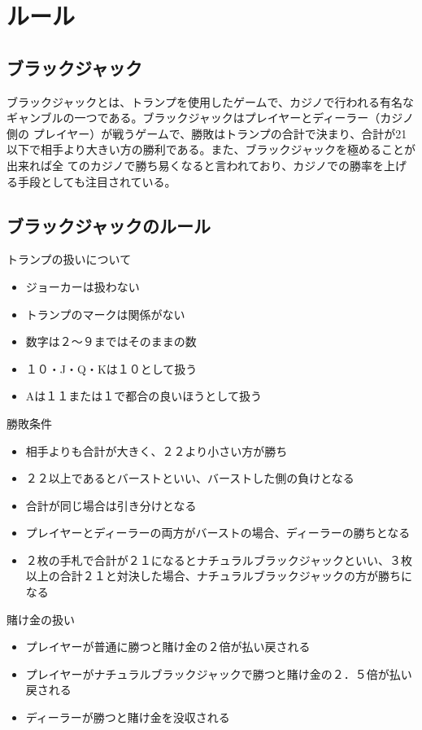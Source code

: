 \section{ルール}
\subsection{ブラックジャック}
ブラックジャックとは、トランプを使用したゲームで、カジノで行われる有名なギャンブルの一つである。ブラックジャックはプレイヤーとディーラー（カジノ側の
プレイヤー）が戦うゲームで、勝敗はトランプの合計で決まり、合計が21以下で相手より大きい方の勝利である。また、ブラックジャックを極めることが出来れば全
てのカジノで勝ち易くなると言われており、カジノでの勝率を上げる手段としても注目されている。

\subsection{ブラックジャックのルール}
トランプの扱いについて
\begin{itemize}
\item ジョーカーは扱わない
\item トランプのマークは関係がない
\item 数字は２～９まではそのままの数
\item １０・J・Q・Kは１０として扱う
\item Aは１１または１で都合の良いほうとして扱う
\end{itemize}
勝敗条件
\begin{itemize}
\item 相手よりも合計が大きく、２２より小さい方が勝ち
\item ２２以上であるとバーストといい、バーストした側の負けとなる
\item 合計が同じ場合は引き分けとなる
\item プレイヤーとディーラーの両方がバーストの場合、ディーラーの勝ちとなる
\item ２枚の手札で合計が２１になるとナチュラルブラックジャックといい、３枚以上の合計２１と対決した場合、ナチュラルブラックジャックの方が勝ちになる
\end{itemize}
賭け金の扱い
\begin{itemize}
\item プレイヤーが普通に勝つと賭け金の２倍が払い戻される
\item プレイヤーがナチュラルブラックジャックで勝つと賭け金の２．５倍が払い戻される
\item ディーラーが勝つと賭け金を没収される
\end{itemize}
